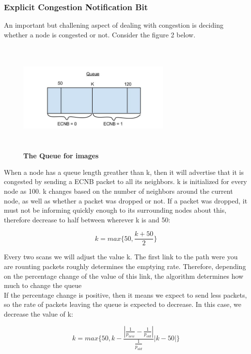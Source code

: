 \documentclass[letterpaper]{article}
\begin{document}
\subsubsection{Explicit Congestion Notification Bit}

An important but challening aspect of dealing with congestion is deciding whether a node is congested or not.
Consider the figure 2 below.
\\
 
\begin{figure}[ht!]
\centering
\includegraphics[width=3in, height=2.2in]{Queue4.jpg}
\caption{\textbf{The Queue for images}}
\end{figure}

\noindent When a node has a queue length greather than k, then it will advertise that it is congested by sending
a ECNB packet to all its neighbors. k is initialized for every node as 100. k changes based on the number of neighbors around the current node, as well as whether a packet was dropped or not. If a packet was
dropped, it must not be informing quickly enough to its surrounding nodes about this, therefore decrease to half 
between wherever k is and 50:

$$ k = max\{50, \frac{k + 50}{2} \}$$

\noindent Every two scans we will adjust the value k. The first link to the path were you are rounting packets
roughly determines the emptying rate. Therefore, depending on the percentage change of the value of this link, 
the algorithm determines how much to change the queue
\\

\noindent If the percentage change is positive, then it means we expect to send less packets, so the rate of packets
leaving the queue is expected to decrease. In this case, we decrease the value of k:

$$ k = max\{50, k -  \frac{|\frac{1}{p_{new}} - \frac{1}{p_{old}}|}{\frac{1}{p_{old}}}|k - 50|   \}$$ 
\end{document}
